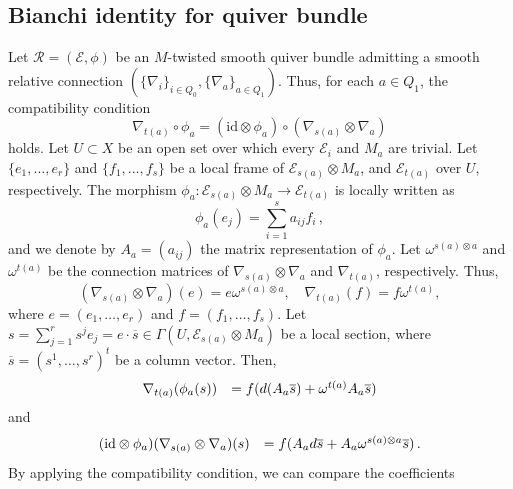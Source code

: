 \documentclass[12pt, reqno]{amsart}
\theoremstyle{plain}
\numberwithin{equation}{section}
\begin{document}
\subsection{Bianchi identity for quiver bundle}
	Let $\mathcal{R}=(\mathcal{E},\phi)$ be an $M$-twisted smooth quiver bundle admitting a smooth relative connection $\left( \{\nabla_i\}_{i\in Q_0}, \{\nabla_a\}_{a\in Q_1}\right)$. Thus,  for each $a\in Q_1$, the compatibility condition
	\begin{equation*}
		\nabla_{t(a)} \circ \phi_{a} = (\mathrm{id} \otimes \phi_{a}) \circ (\nabla_{s(a)}\otimes \nabla_{a})
	\end{equation*}
	holds. Let $U\subset X$ be an open set over which every $\mathcal{E}_i$ and $M_a$ are trivial. Let $\{e_1, \ldots ,e_r\}$ and $\{f_1, \ldots ,f_s\}$ be a local frame of $\mathcal{E}_{s(a)} \otimes M_a$, and $\mathcal{E}_{t(a)}$  over $U$, respectively. The morphism $\phi_a:\mathcal{E}_{s(a)} \otimes M_a \rightarrow \mathcal{E}_{t(a)}$ is locally written as 
	$$\phi_a(e_j)= \sum_{i=1}^{s}a_{ij} f_i\,,$$
	and we denote by $A_a=(a_{ij})$ the matrix representation of $\phi_{a}$. Let $\omega^{s(a)\otimes a}$ and $\omega^{t(a)}$ be the connection matrices of $\nabla_{s(a)} \otimes \nabla_a$ and $\nabla_{t(a)}$, respectively. Thus, $$\left(\nabla_{s(a)} \otimes \nabla_a\right)(e)=e\omega^{s(a)\otimes a}, \quad \nabla_{t(a)}(f)=f\omega^{t(a)},$$ 
	where $e=(e_1,\ldots, e_r)$ and $f=(f_1,\ldots, f_s)$. Let $s=\sum_{j=1}^{r} s^{j}e_j = e\cdot \overline{s} \in \Gamma(U, \mathcal{E}_{s(a)} \otimes M_a)$ be a local section, where $\overline{s}=(s^1,\ldots , s^r)^t $ be a column vector. Then,
	\begin{equation*}
		\begin{array}{@{}rl@{}}
			\nabla_{t(a)}(\phi_a(s)) & = f (d(A_a\overline{s})+\omega^{t(a)}A_a\overline{s})\\
			
		\end{array} 
	\end{equation*}
	and
	\begin{equation*}
		\begin{array}{@{}rl@{}}
			(\mathrm{id} \otimes \phi_a)(\nabla_{s(a)} \otimes \nabla_a)(s) & = f(A_ad\overline{s}+A_a\omega^{s(a)\otimes a}\overline{s} )\,.  \\
			
		\end{array} 
	\end{equation*}
	By applying the compatibility condition, we can compare the coefficients
\end{document}
